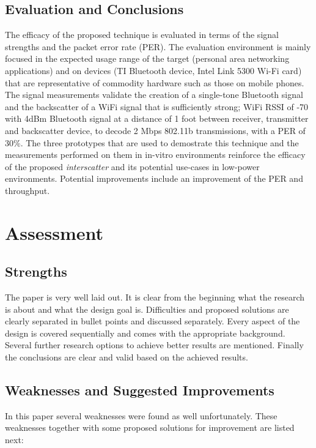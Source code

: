 \documentclass[a4paper]{article}
\begin{document}
\subsection{Evaluation and Conclusions}
The efficacy of the proposed technique is evaluated in terms of the signal strengths and the packet error rate (PER). The evaluation environment is mainly focused in the expected usage range of the target (personal area networking applications) and on devices (TI Bluetooth device, Intel Link 5300 Wi-Fi card) that are representative of commodity hardware such as those on mobile phones. The signal measurements validate the creation of a single-tone Bluetooth signal and the backscatter of a WiFi signal that is sufficiently strong; WiFi RSSI of -70 with 4dBm Bluetooth signal at a distance of 1 foot between receiver, transmitter and backscatter device, to decode 2 Mbps 802.11b transmissions, with a PER of 30\%. 
The three prototypes that are used to demostrate this technique and the measurements performed on them in in-vitro environments reinforce the efficacy of the proposed \textit{interscatter} and its potential use-cases in low-power environments. Potential improvements include an improvement of the PER and throughput.

\section{Assessment}
\subsection{Strengths}
The paper is very well laid out. It is clear from the beginning what the research is about and what the design goal is. Difficulties and proposed solutions are clearly separated in bullet points and discussed separately. Every aspect of the design is covered sequentially and comes with the appropriate background. Several further research options to achieve better results are mentioned. Finally the conclusions are clear and valid based on the achieved results.

\subsection{Weaknesses and Suggested Improvements}
In this paper several weaknesses were found as well unfortunately. These weaknesses together with some proposed solutions for improvement are listed next:
\end{document}
